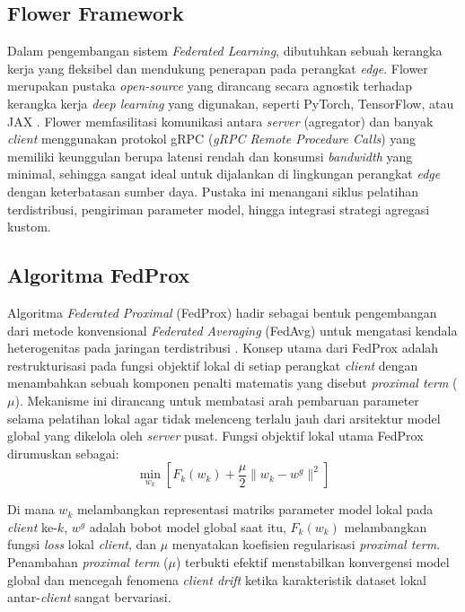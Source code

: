 \documentclass[conference]{IEEEtran}
\begin{document}
\subsection{Flower Framework}
Dalam pengembangan sistem \textit{Federated Learning}, dibutuhkan sebuah kerangka kerja yang fleksibel dan mendukung penerapan pada perangkat \textit{edge}. Flower merupakan pustaka \textit{open-source} yang dirancang secara agnostik terhadap kerangka kerja \textit{deep learning} yang digunakan, seperti PyTorch, TensorFlow, atau JAX \cite{b7}. Flower memfasilitasi komunikasi antara \textit{server} (agregator) dan banyak \textit{client} menggunakan protokol gRPC (\textit{gRPC Remote Procedure Calls}) yang memiliki keunggulan berupa latensi rendah dan konsumsi \textit{bandwidth} yang minimal, sehingga sangat ideal untuk dijalankan di lingkungan perangkat \textit{edge} dengan keterbatasan sumber daya. Pustaka ini menangani siklus pelatihan terdistribusi, pengiriman parameter model, hingga integrasi strategi agregasi kustom.

\subsection{Algoritma FedProx}
Algoritma \textit{Federated Proximal} (FedProx) hadir sebagai bentuk pengembangan dari metode konvensional \textit{Federated Averaging} (FedAvg) untuk mengatasi kendala heterogenitas pada jaringan terdistribusi \cite{b8}. Konsep utama dari FedProx adalah restrukturisasi pada fungsi objektif lokal di setiap perangkat \textit{client} dengan menambahkan sebuah komponen penalti matematis yang disebut \textit{proximal term} ($\mu$). Mekanisme ini dirancang untuk membatasi arah pembaruan parameter selama pelatihan lokal agar tidak melenceng terlalu jauh dari arsitektur model global yang dikelola oleh \textit{server} pusat. Fungsi objektif lokal utama FedProx dirumuskan sebagai:
\begin{equation}
  \label{eq:fedprox-obj}
  \min_{w_k} \left[ F_k(w_k) + \frac{\mu}{2} \|w_k - w^g\|^2 \right]
\end{equation}

Di mana $w_k$ melambangkan representasi matriks parameter model lokal pada \textit{client} ke-$k$, $w^g$ adalah bobot model global saat itu, $F_k(w_k)$ melambangkan fungsi \textit{loss} lokal \textit{client}, dan $\mu$ menyatakan koefisien regularisasi \textit{proximal term}. Penambahan \textit{proximal term} ($\mu$) terbukti efektif menstabilkan konvergensi model global dan mencegah fenomena \textit{client drift} ketika karakteristik dataset lokal antar-\textit{client} sangat bervariasi.
\end{document}
